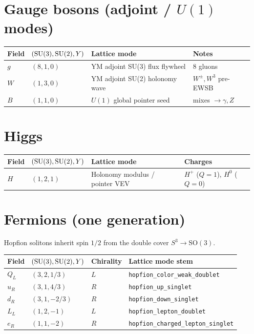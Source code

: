\documentclass[11pt]{article}
\begin{document}
\section{Gauge bosons (adjoint / $U(1)$ modes)}

\begin{center}
\begin{tabular}{@{}llll@{}}
\hline
Field & $({\rm SU}(3),{\rm SU}(2),Y)$ & Lattice mode & Notes \\
\hline
$g$ & $(8,1,0)$ & YM adjoint SU(3) flux flywheel & 8 gluons \\
$W$ & $(1,3,0)$ & YM adjoint SU(2) holonomy wave & $W^\pm,W^3$ pre-EWSB \\
$B$ & $(1,1,0)$ & $U(1)$ global pointer seed & mixes $\to\gamma,Z$ \\
\hline
\end{tabular}
\end{center}

\section{Higgs}

\begin{center}
\begin{tabular}{@{}llll@{}}
\hline
Field & $({\rm SU}(3),{\rm SU}(2),Y)$ & Lattice mode & Charges \\
\hline
$H$ & $(1,2,1)$ & Holonomy modulus / pointer VEV & $H^+$ ($Q=1$), $H^0$ ($Q=0$) \\
\hline
\end{tabular}
\end{center}

\section{Fermions (one generation)}

Hopfion solitons inherit spin $1/2$ from the double cover $S^3\to\mathrm{SO}(3)$.

\begin{center}
\begin{tabular}{@{}llll@{}}
\hline
Field & $({\rm SU}(3),{\rm SU}(2),Y)$ & Chirality & Lattice mode stem \\
\hline
$Q_L$ & $(3,2,1/3)$ & $L$ & \texttt{hopfion\_color\_weak\_doublet} \\
$u_R$ & $(3,1,4/3)$ & $R$ & \texttt{hopfion\_up\_singlet} \\
$d_R$ & $(3,1,-2/3)$ & $R$ & \texttt{hopfion\_down\_singlet} \\
$L_L$ & $(1,2,-1)$ & $L$ & \texttt{hopfion\_lepton\_doublet} \\
$e_R$ & $(1,1,-2)$ & $R$ & \texttt{hopfion\_charged\_lepton\_singlet} \\
\hline
\end{tabular}
\end{center}
\end{document}
